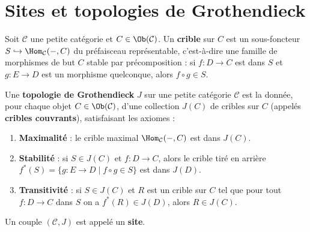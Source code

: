 
\section{Sites et topologies de Grothendieck}\label{sec:sites}

\begin{definition}[Crible]\label{def:crible}
Soit $\mathcal{C}$ une petite catégorie et $C \in \Ob(\mathcal{C})$.
Un \textbf{crible} sur $C$ est un sous-foncteur
$S \hookrightarrow \Hom_\mathcal{C}(-, C)$
du préfaisceau représentable, c'est-à-dire une famille de morphismes
de but $C$ stable par précomposition : si $f \colon D \to C$ est dans
$S$ et $g \colon E \to D$ est un morphisme quelconque, alors
$f \circ g \in S$.
\end{definition}

\begin{definition}\label{def:topologie-grothendieck}
Une \textbf{topologie de Grothendieck} $J$ sur une petite catégorie
$\mathcal{C}$ est la donnée, pour chaque objet $C \in \Ob(\mathcal{C})$,
d'une collection $J(C)$ de cribles sur $C$ (appelés \textbf{cribles
couvrants}), satisfaisant les axiomes :
\begin{enumerate}[label=(T\arabic*)]
\item \textbf{Maximalité} : le crible maximal
      $\Hom_\mathcal{C}(-, C)$ est dans $J(C)$.
\item \textbf{Stabilité} : si $S \in J(C)$ et $f \colon D \to C$,
      alors le crible tiré en arrière
      $f^*(S) = \{g \colon E \to D \mid f \circ g \in S\}$
      est dans $J(D)$.
\item \textbf{Transitivité} : si $S \in J(C)$ et $R$ est un crible
      sur $C$ tel que pour tout $f \colon D \to C$ dans $S$ on a
      $f^*(R) \in J(D)$, alors $R \in J(C)$.
\end{enumerate}
Un couple $(\mathcal{C}, J)$ est appelé un \textbf{site}.
\end{definition}

